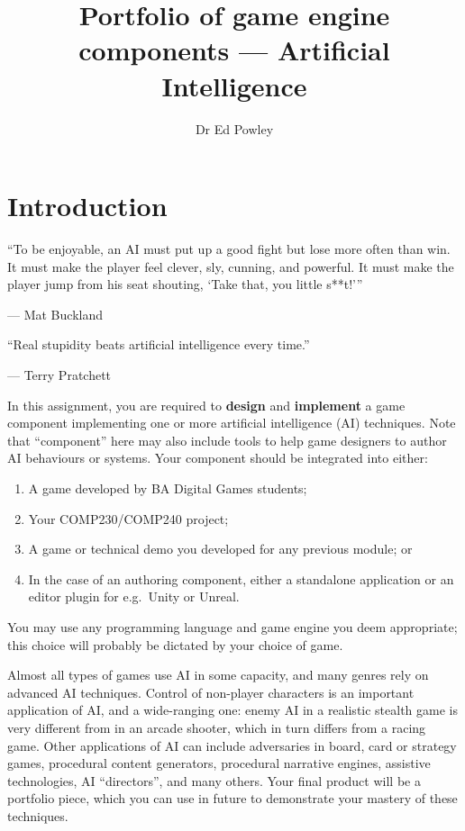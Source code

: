 \documentclass{../../fal_assignment}
\title{Portfolio of game engine components --- Artificial Intelligence}
\author{Dr Ed Powley}
\begin{document}
\maketitle

\section*{Introduction}

\begin{marginquote}
``To be enjoyable, an AI must put up a good fight but lose more often than win. It must make the player feel clever, sly, cunning, and powerful. It must make the player jump from his seat shouting, `Take that, you little s**t!'\thinspace''

--- Mat Buckland

    \marginquoterule

``Real stupidity beats artificial intelligence every time.''

--- Terry Pratchett
\end{marginquote}

In this assignment, you are required to \textbf{design} and \textbf{implement} a game component
implementing one or more artificial intelligence (AI) techniques.
Note that ``component'' here may also include tools to help game designers to author AI behaviours or systems.
Your component should be integrated into either:
\begin{enumerate}[label=(\Alph*)]
	\item A game developed by BA Digital Games students;
	\item Your COMP230/COMP240 project;
	\item A game or technical demo you developed for any previous module; or
	\item In the case of an authoring component, either a standalone application
		or an editor plugin for e.g.\ Unity or Unreal.
\end{enumerate}
You may use any programming language and game engine you deem appropriate;
this choice will probably be dictated by your choice of game.

Almost all types of games use AI in some capacity, and many genres rely on advanced AI techniques.
Control of non-player characters is an important application of AI,
and a wide-ranging one: enemy AI in a realistic stealth game is very different from in an arcade shooter,
which in turn differs from a racing game.
Other applications of AI can include adversaries in board, card or strategy games,
procedural content generators,
procedural narrative engines,
assistive technologies,
AI ``directors'',
and many others.
Your final product will be a portfolio piece, which you can use in future to demonstrate your mastery of these techniques.
\end{document}
